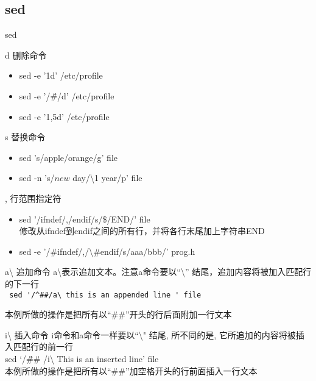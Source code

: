 \subsection{sed}

\begin{frame}{sed}

\begin{block}{\alert{d} 删除命令}
\begin{itemize}
\item sed -e '1d' /etc/profile
\item sed -e '/\^\#/d' /etc/profile
\item sed -e '1,5d' /etc/profile
\end{itemize}
\end{block}

\begin{block}{\alert{s} 替换命令}
\begin{itemize}
\item sed 's/apple/orange/g' file
\item sed -n 's/\(new\) day/\textbackslash{}1 year/p' file 
\end{itemize}
\end{block}

\begin{block}{\alert{,} 行范围指定符}
\begin{itemize}
\item sed '/ifndef/,/endif/s/\$/END/' file \\
修改从ifndef到endif之间的所有行，并将各行末尾加上字符串END 
\item sed -e '/\#ifndef/,/\textbackslash{}\#endif/s/aaa/bbb/' prog.h
\end{itemize}
\end{block}

\begin{block}{\alert{a\textbackslash} 追加命令}
a\textbackslash 表示追加文本。注意a命令要以“\textbackslash{}” 结尾，追加内容将被加入匹配行的下一行 \\
\verb| sed '/^##/a\ this is an appended line ' file |

本例所做的操作是把所有以“\#\#”开头的行后面附加一行文本
\end{block}

\begin{block}{\alert{i\textbackslash}  插入命令}
i命令和a命令一样要以“\textbackslash" 结尾, 所不同的是, 它所追加的内容将被插入匹配行的前一行 \\
sed ‘/\^\#\# /i\textbackslash{} This is an inserted line’ file \\
本例所做的操作是把所有以“\#\#”加空格开头的行前面插入一行文本
\end{block}


\end{frame}
